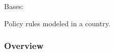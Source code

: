 \documentclass[letterpaper,10pt,english]{sphinxmanual}
\begin{document}

\begin{fulllineitems}
\label{\detokenize{autoapi/euromod/core/index:euromod.core.Policy}}
\pysigstartsignatures
{}
\pysigstopsignatures
\sphinxAtStartPar
Bases: 

\sphinxAtStartPar
Policy rules modeled in a country.
\subsubsection*{Overview}



\end{fulllineitems}
\end{document}
